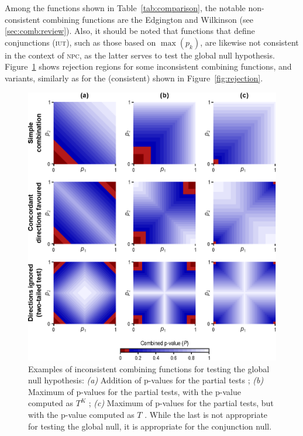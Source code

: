 Among the functions shown in Table~\ref{tab:comparison}, the notable non-consistent combining functions are the Edgington and Wilkinson (see \ref{sec:comb:review}). Also, it should be noted that functions that define conjunctions (\textsc{iut}), such as those based on $\max\left(p_k\right)$, are likewise not consistent in the context of \textsc{npc}, as the latter serves to test the global null hypothesis. Figure~\ref{fig:inconsistent} shows rejection regions for some inconsistent combining functions, and variants, similarly as for the (consistent) shown in Figure~\ref{fig:rejection}.

\begin{figure}[p]
\begin{center}
\centerline{\includegraphics[scale=.8]{images/inconsistent.eps}}
\end{center}
\caption[Examples of inconsistent combining functions.]{Examples of inconsistent combining functions for testing the global null hypothesis: \emph{(a)} Addition of p-values for the partial tests \citep{Edgington1972}; \emph{(b)} Maximum of p-values for the partial tests, with the p-value computed as $T^K$ \citep{Friston1999, Friston2005}; \emph{(c)} Maximum of p-values for the partial tests, but with the p-value computed as $T$ \citep{Nichols2005}. While the last is not appropriate for testing the global null, it is appropriate for the conjunction null.}
\label{fig:inconsistent}
\end{figure}

